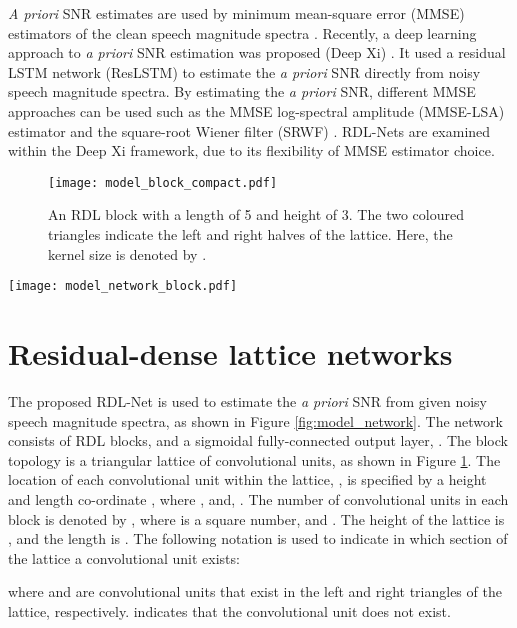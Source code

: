 \documentclass[letterpaper]{article} \usepackage{aaai20}  \usepackage{times}  \usepackage{helvet} \usepackage{courier}  \usepackage[hyphens]{url}  \usepackage{graphicx} \urlstyle{rm} \def\UrlFont{\rm}  \usepackage{graphicx}  \frenchspacing  \setlength{\pdfpagewidth}{8.5in}  \setlength{\pdfpageheight}{11in}
\begin{document}
\textit{A priori} SNR estimates are used by minimum mean-square error (MMSE) estimators of the clean speech magnitude spectra \cite{1164453}. Recently, a deep learning approach to \textit{a priori} SNR estimation was proposed (Deep Xi) \cite{nicolson2019deep}. It used a residual LSTM network (ResLSTM) to estimate the \textit{a priori} SNR directly from noisy speech magnitude spectra. By estimating the \textit{a priori} SNR, different MMSE approaches can be used such as the MMSE log-spectral amplitude (MMSE-LSA) estimator \cite{1164550} and the square-root Wiener filter (SRWF) \cite{1455809}. RDL-Nets are examined within the Deep Xi framework, due to its flexibility of MMSE estimator choice.
\begin{figure}[t]
\centering
\centering
	\texttt{[image: model\_block\_compact.pdf]}\caption{An RDL block with a length of 5 and height of 3. The two coloured triangles indicate the left and right halves of the lattice. Here, the kernel size is denoted by .}
	\label{fig:model_block}
\end{figure}
\begin{figure*}[ht]
	\centering 
\texttt{[image: model\_network\_block.pdf]}
	\caption{The proposed RDL-Net for speech enhancement. The RDL-Net estimates the \textit{a priori} SNR from the given noisy speech magnitude spectrum. The estimated \textit{a priori} SNR is then used by an MMSE clean speech magnitude spectrum estimator.}
	\label{fig:model_network}
\end{figure*}
\section{Residual-dense lattice networks} \label{seca}

The proposed RDL-Net is used to estimate the \textit{a priori} SNR from given noisy speech magnitude spectra, as shown in Figure \ref{fig:model_network}. The network consists of  RDL blocks, and a sigmoidal fully-connected output layer, . The block topology is a triangular lattice of convolutional units, as shown in Figure \ref{fig:model_block}. The location of each convolutional unit within the lattice, , is specified by a height and length co-ordinate , where , and, . The number of convolutional units in each block is denoted by , where  is a square number, and . The height of the lattice is , and the length is . The following notation is used to indicate in which section of the lattice a convolutional unit exists:


where  and  are convolutional units that exist in the left and right triangles of the lattice, respectively.  indicates that the convolutional unit does not exist. 
\end{document}
